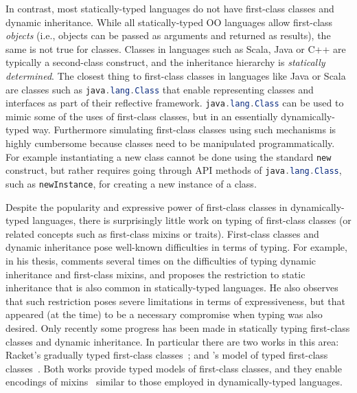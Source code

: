 In contrast, most statically-typed
languages do not have first-class classes and dynamic
inheritance. While all statically-typed OO languages allow first-class
\emph{objects} (i.e., objects can be passed as arguments and returned
as results), the same is not true for classes. Classes in languages such as
Scala, Java or C++ are typically a second-class construct, and the
inheritance hierarchy is \emph{statically determined}. The closest thing
to first-class classes in
languages like Java or Scala are classes such as
\lstinline[language=java]{java.lang.Class} that enable representing classes and
interfaces as part of their reflective framework. \lstinline[language=java]{java.lang.Class} can be used to
mimic some of the uses of first-class classes, but in an essentially
dynamically-typed way. Furthermore simulating first-class classes
using such mechanisms is highly cumbersome because classes need to be
manipulated programmatically. For example instantiating a new class
cannot be done using the standard \lstinline{new} construct, but
rather requires going through API methods of
\lstinline[language=java]{java.lang.Class}, such as \lstinline{newInstance}, for
creating a new instance of a class.

Despite the popularity and expressive power of first-class classes in dynamically-typed
languages, there is surprisingly little work on typing of first-class
classes (or related concepts such as first-class mixins or traits).
First-class classes and dynamic inheritance pose well-known
difficulties in terms of typing. For example, in his thesis,
\citet{bracha1992programming} comments several times on the difficulties of typing
dynamic inheritance and first-class mixins, and proposes the
restriction to static inheritance that is also common in
statically-typed languages. He also observes that such restriction
poses severe limitations in terms of expressiveness, but that appeared
(at the time)
to be a necessary compromise when typing was also desired.
Only recently some progress has been made in statically typing
first-class classes and dynamic inheritance. In particular there are
two works in this area: Racket's gradually
typed first-class classes~\citep{DBLP:conf/oopsla/TakikawaSDTF12}; and \citeauthor{DBLP:conf/ecoop/LeeASP15}'s model of
typed first-class classes~\citep{DBLP:conf/ecoop/LeeASP15}. Both works provide typed models of
first-class classes, and they enable encodings of mixins~\citep{bracha1990mixin}
similar to those employed in dynamically-typed languages.

